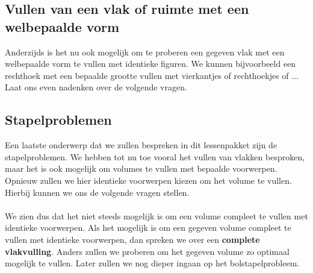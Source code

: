 \subsection{Vullen van een vlak of ruimte met een welbepaalde vorm}
Anderzijds is het nu ook mogelijk om te proberen een gegeven vlak met een welbepaalde vorm te vullen met identieke figuren. We kunnen bijvoorbeeld een rechthoek met een bepaalde grootte vullen met vierkantjes of rechthoekjes of $\ldots$ Laat ons even nadenken over de volgende vragen.\\
\subsection{Stapelproblemen}
Een laatste onderwerp dat we zullen bespreken in dit lessenpakket zijn de stapelproblemen. We hebben tot nu toe vooral het vullen van vlakken besproken, maar het is ook mogelijk om volumes te vullen met bepaalde voorwerpen. Opnieuw zullen we hier identieke voorwerpen kiezen om het volume te vullen. Hierbij kunnen we ons de volgende vragen stellen.\\
\\
We zien dus dat het niet steeds mogelijk is om een volume compleet te vullen met identieke voorwerpen. Als het mogelijk is om een gegeven volume compleet te vullen met identieke voorwerpen, dan spreken we over een \textbf{complete vlakvulling}. Anders zullen we proberen om het gegeven volume zo optimaal mogelijk te vullen. Later zullen we nog dieper ingaan op het bolstapelprobleem.
